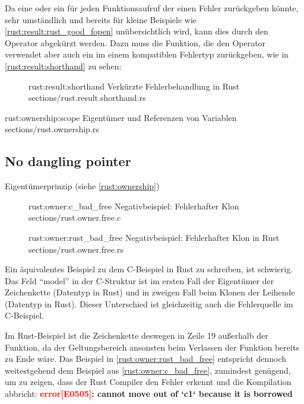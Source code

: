 Da eine  oder ein  für jeden Funktionsaufruf der einen Fehler zurückgeben könnte, sehr umständlich und bereits für kleine Beispiele wie \autoref{rust:result:rust_good_fopen} unübersichtlich wird, kann dies durch den Operator  abgekürzt werden.
Dazu muss die Funktion, die den Operator verwendet aber auch ein  im einem kompatiblen Fehlertyp zurückgeben, wie in \autoref{rust:result:shorthand} zu sehen:

\begin{figure}[H]
	\rustcinclude
		{rust:result:shorthand}
		{Verkürzte Fehlerbehandlung in Rust}
		{sections/rust.result.shorthand.rs}
\end{figure}



\rustcinclude
{rust:ownership:scope}
{Eigentümer und Referenzen von Variablen}
{sections/rust.ownership.rs}

\subsection{No dangling pointer}
\label{rust:guarantee:no_dangling_pointer}

 Eigentümerprinzip (siehe \autoref{rust:ownership})



\begin{figure}[H]
	\ccinclude
	{rust:owner:c_bad_free}
	{Negativbeispiel: Fehlerhafter Klon }
	{sections/rust.owner.free.c}
\end{figure}

\begin{figure}[H]
	\rustcinclude
	{rust:owner:rust_bad_free}
	{Negativbeispiel: Fehlerhafter Klon in Rust}
	{sections/rust.owner.free.rs}
\end{figure}


Ein äquivalentes Beispiel zu dem C-Beispiel in Rust zu schreiben, ist schwierig.
Das Feld \enquote{model} in der C-Struktur ist im ersten Fall der Eigentümer der Zeichenkette (Datentyp  in Rust) und in zweigen Fall beim Klonen der Leihende (Datentyp  in Rust).
Dieser Unterschied ist gleichzeitig auch die Fehlerquelle im C-Beispiel.

Im Rust-Beispiel ist die Zeichenkette deswegen in Zeile 19 außerhalb der  Funktion, da der Geltungsbereich ansonsten beim Verlassen der Funktion bereits zu Ende wäre.
Das Beispiel in \autoref{rust:owner:rust_bad_free} entspricht dennoch weitestgehend dem Beispiel aus \autoref{rust:owner:c_bad_free}, zumindest genügend, um zu zeigen, dass der Rust Compiler den Fehler erkennt und die Kompilation abbricht: \textbf{\textcolor{red}{error[E0505]}: cannot move out of `c1` because it is borrowed}

